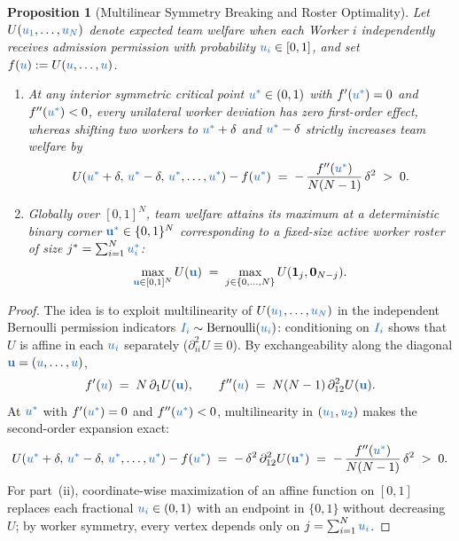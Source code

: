 \documentclass[11pt,reqno]{amsart}
\theoremstyle{spacious}
\newtheorem{proposition}{Proposition}[section]
\newcommand{\Wtxt}[1]{\textcolor{colW}{#1}}
\newcommand{\Wv}[1]{{\color{colW}#1}}
\begin{document}
\begin{proposition}[Multilinear Symmetry Breaking and Roster Optimality]
\label{prop:symbreak}
Let $U(\Wv{u_1},\dots,\Wv{u_N})$ denote expected team welfare when each \Wtxt{Worker} $i$ independently receives admission permission with probability $\Wv{u_i} \in [0,1]$, and set $f(\Wv{u}) := U(\Wv{u},\dots,\Wv{u})$.
\begin{enumerate}
  \setlength{\itemsep}{4pt}
  \item[(i)] At any interior symmetric critical point $\Wv{u^*} \in (0,1)$ with $f'(\Wv{u^*}) = 0$ and $f''(\Wv{u^*}) < 0$, every unilateral \Wtxt{worker} deviation has zero first-order effect, whereas shifting two \Wtxt{workers} to $\Wv{u^*} + \delta$ and $\Wv{u^*} - \delta$ strictly increases team welfare by
  \[
    U(\Wv{u^*} + \delta,\, \Wv{u^*} - \delta,\, \Wv{u^*},\dots,\Wv{u^*}) - f(\Wv{u^*})
    \;=\; -\,\frac{f''(\Wv{u^*})}{N(N - 1)}\,\delta^2 \;>\; 0.
  \]
  \item[(ii)] Globally over $[0,1]^N$, team welfare attains its maximum at a deterministic binary corner $\Wv{\mathbf{u}^*} \in \{0,1\}^N$ corresponding to a fixed-size active \Wtxt{worker} roster of size $j^* = \sum_{i=1}^N \Wv{u_i^*}$:
  \[
    \max_{\Wv{\mathbf{u}} \in [0,1]^N} U(\Wv{\mathbf{u}})
    \;=\; \max_{j \in \{0,\dots,N\}} U(\mathbf{1}_j, \mathbf{0}_{N-j}).
  \]
\end{enumerate}
\end{proposition}

\begin{proof}
The idea is to exploit multilinearity of $U(\Wv{u_1},\dots,\Wv{u_N})$ in the independent Bernoulli permission indicators $\Wv{I_i} \sim \mathrm{Bernoulli}(\Wv{u_i})$: conditioning on $\Wv{I_i}$ shows that $U$ is affine in each $\Wv{u_i}$ separately ($\partial_{ii}^2 U \equiv 0$). By exchangeability along the diagonal $\Wv{\mathbf{u}} = (\Wv{u},\dots,\Wv{u})$,
\[
  f'(\Wv{u}) \;=\; N\,\partial_1 U(\Wv{\mathbf{u}}), \qquad
  f''(\Wv{u}) \;=\; N(N - 1)\,\partial_{12}^2 U(\Wv{\mathbf{u}}).
\]
At $\Wv{u^*}$ with $f'(\Wv{u^*}) = 0$ and $f''(\Wv{u^*}) < 0$, multilinearity in $(\Wv{u_1}, \Wv{u_2})$ makes the second-order expansion exact:
\[
  U(\Wv{u^*} + \delta,\, \Wv{u^*} - \delta,\, \Wv{u^*},\dots,\Wv{u^*}) - f(\Wv{u^*})
  \;=\; -\,\delta^2\,\partial_{12}^2 U(\Wv{\mathbf{u}^*})
  \;=\; -\,\frac{f''(\Wv{u^*})}{N(N - 1)}\,\delta^2 \;>\; 0.
\]
For part~(ii), coordinate-wise maximization of an affine function on $[0,1]$ replaces each fractional $\Wv{u_i} \in (0,1)$ with an endpoint in $\{0,1\}$ without decreasing $U$; by \Wtxt{worker} symmetry, every vertex depends only on $j = \sum_{i=1}^N \Wv{u_i}$.
\end{proof}
\end{document}

